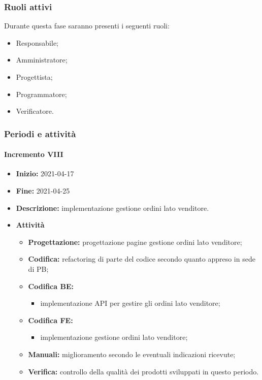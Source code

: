\subsubsection{Ruoli attivi}
Durante questa fase saranno presenti i seguenti ruoli:
\begin{itemize}
    \item Responsabile;
    \item Amministratore;
    \item Progettista;
    \item Programmatore;
    \item Verificatore.
\end{itemize}

\subsubsection{Periodi e attività}

\paragraph[Incremento VIII]{Incremento VIII}
\begin{itemize}
    \item [] \textbf{Inizio:} 2021-04-17
    \item [] \textbf{Fine:} 2021-04-25
    \item [] \textbf{Descrizione:} implementazione gestione ordini lato venditore.
    \item [] \textbf{Attività}
          \begin{itemize}
              \item \textbf{Progettazione:} progettazione pagine gestione ordini lato venditore;
              \item \textbf{Codifica:} refactoring di parte del codice secondo quanto appreso in sede di PB;
              \item \textbf{Codifica BE:}
                    \begin{itemize}
                        \item implementazione API per gestire gli ordini lato venditore;
                    \end{itemize}
              \item \textbf{Codifica FE:}
                    \begin{itemize}
                        \item implementazione gestione ordini lato venditore;
                    \end{itemize}
              \item \textbf{Manuali:} miglioramento secondo le eventuali indicazioni ricevute;
              \item \textbf{Verifica:} controllo della qualità dei prodotti sviluppati in questo periodo.
          \end{itemize}
\end{itemize}

